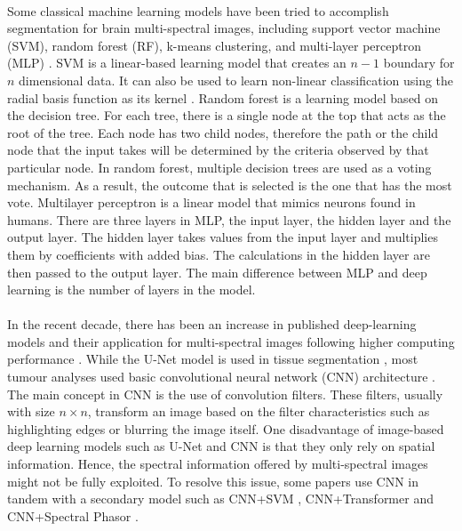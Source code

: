 \documentclass[12pt]{article}
\begin{document}
    \paragraph{}
    Some classical machine learning models have been tried to accomplish segmentation for brain multi-spectral images, including support vector machine (SVM), random forest (RF), k-means clustering, and multi-layer perceptron (MLP) \cite{fabelo_helicoid_2016, manni_hyperspectral_2020, leon_hyperspectral_2022, giannantonio_intra-operative_2023}. SVM is a linear-based learning model that creates an \(n-1\) boundary for \(n\) dimensional data. It can also be used to learn non-linear classification using the radial basis function as its kernel \cite{giannantonio_intra-operative_2023}. Random forest is a learning model based on the decision tree. For each tree, there is a single node at the top that acts as the root of the tree. Each node has two child nodes, therefore the path or the child node that the input takes will be determined by the criteria observed by that particular node. In random forest, multiple decision trees are used as a voting mechanism. As a result, the outcome that is selected is the one that has the most vote. Multilayer perceptron is a linear model that mimics neurons found in humans. There are three layers in MLP, the input layer, the hidden layer and the output layer. The hidden layer takes values from the input layer and multiplies them by coefficients with added bias. The calculations in the hidden layer are then passed to the output layer. The main difference between MLP and deep learning is the number of layers in the model.
    
    \paragraph{}
    In the recent decade, there has been an increase in published deep-learning models and their application for multi-spectral images following higher computing performance \cite{khan_trends_2021}.  While the U-Net model \cite{ronneberger_u-net_2015} is used in tissue segmentation \cite{seidlitz_robust_2022}, most tumour analyses used basic convolutional neural network (CNN) architecture \cite{manni_hyperspectral_2020, giannantonio_intra-operative_2023, haj-hassan_classifications_2017}. The main concept in CNN is the use of convolution filters. These filters, usually with size \(n \times n\), transform an image based on the filter characteristics such as highlighting edges or blurring the image itself. One disadvantage of image-based deep learning models such as U-Net and CNN is that they only rely on spatial information. Hence, the spectral information offered by multi-spectral images might not be fully exploited. To resolve this issue, some papers use CNN in tandem with a secondary model such as CNN+SVM \cite{manni_hyperspectral_2020}, CNN+Transformer \cite{yun_spectr_2021} and CNN+Spectral Phasor \cite{hao_fusing_2021}.
    
\end{document}
